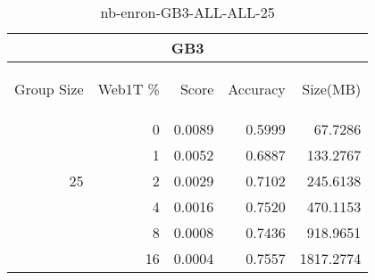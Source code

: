 \begin{center}
\begin{table}[htbp] 
 \begin{center}
\begin{tabular}{ | r | r | r | r | r |}
\hline
\multicolumn{5}{|c|}{GB3}\\
\hline
\begin{sideways}Group Size\end{sideways} & \begin{sideways}Web1T \%\end{sideways} & \begin{sideways}Score\end{sideways} & \begin{sideways}Accuracy\end{sideways} & \begin{sideways}Size(MB)\end{sideways}\\
\hline
\multirow{5}{*}{25}
 & 0 & 0.0089 & 0.5999 & 67.7286\\ \cline{2-5}
 & 1 & 0.0052 & 0.6887 & 133.2767\\ \cline{2-5}
 & 2 & 0.0029 & 0.7102 & 245.6138\\ \cline{2-5}
 & 4 & 0.0016 & 0.7520 & 470.1153\\ \cline{2-5}
 & 8 & 0.0008 & 0.7436 & 918.9651\\ \cline{2-5}
 & 16 & 0.0004 & 0.7557 & 1817.2774\\ \cline{2-5}
\hline
\end{tabular}
\caption{nb-enron-GB3-ALL-ALL-25}
\label{table:nb-enron-GB3-ALL-ALL-25}
\end{center}
 \end{table}
\end{center}

